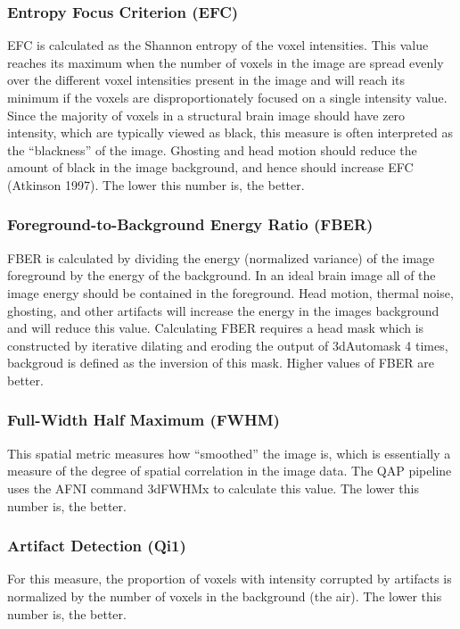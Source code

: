 \subsubsection{Entropy Focus Criterion (EFC)}
\label{sec:5}
EFC is calculated as the Shannon entropy of the voxel intensities. This value reaches its maximum when the number of voxels in the image are spread evenly over the different voxel intensities present in the image and will reach its minimum if the voxels are disproportionately focused on a single intensity value. Since the majority of voxels in a structural brain image should have zero intensity, which are typically viewed as black, this measure is often interpreted as the “blackness” of the image. Ghosting and head motion should reduce the amount of black in the image background, and hence should increase EFC (Atkinson 1997). The lower this number is, the better.
\subsubsection{Foreground-to-Background Energy Ratio (FBER)}
\label{sec:6}
FBER is calculated by dividing the energy (normalized variance) of the image foreground by the energy of the background. In an ideal brain image all of the image energy should be contained in the foreground. Head motion, thermal noise, ghosting, and other artifacts will increase the energy in the images background and will reduce this value. Calculating FBER requires a head mask which is constructed by iterative dilating and eroding the output of 3dAutomask 4 times, backgroud is defined as the inversion of this mask. Higher values of FBER are better. 
\subsubsection{Full-Width Half Maximum (FWHM)}
\label{sec:7}
This spatial metric measures how “smoothed” the image is, which is essentially a measure of the degree of spatial correlation in the image data. The QAP pipeline uses the AFNI command 3dFWHMx to calculate this value. The lower this number is, the better.
\subsubsection{Artifact Detection (Qi1)}
\label{sec:8}
For this measure, the proportion of voxels with intensity corrupted by artifacts is normalized by the number of voxels in the background (the air). The lower this number is, the better.
